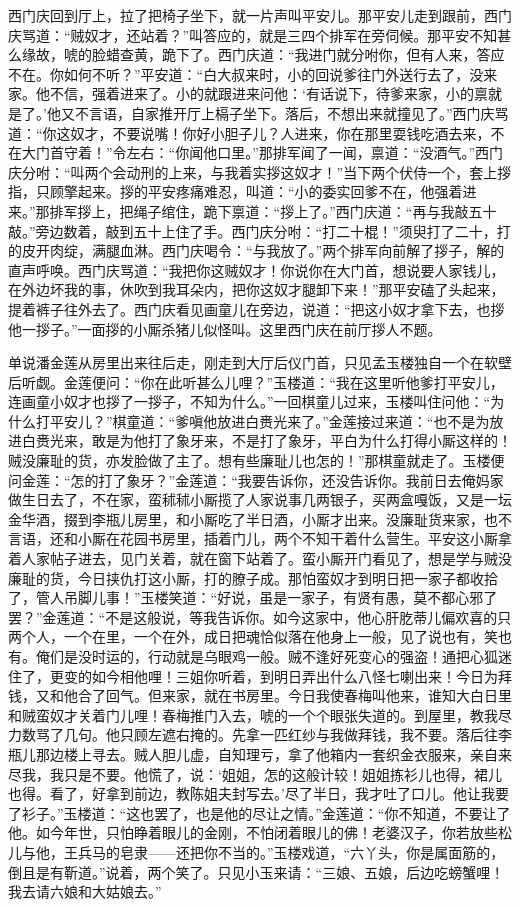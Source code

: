 西门庆回到厅上，拉了把椅子坐下，就一片声叫平安儿。那平安儿走到跟前，西门庆骂道：“贼奴才，还站着？”叫答应的，就是三四个排军在旁伺候。那平安不知甚么缘故，唬的脸蜡查黄，跪下了。西门庆道：“我进门就分咐你，但有人来，答应不在。你如何不听？”平安道：“白大叔来时，小的回说爹往门外送行去了，没来家。他不信，强着进来了。小的就跟进来问他：‘有话说下，待爹来家，小的禀就是了。’他又不言语，自家推开厅上槅子坐下。落后，不想出来就撞见了。”西门庆骂道：“你这奴才，不要说嘴！你好小胆子儿？人进来，你在那里耍钱吃酒去来，不在大门首守着！”令左右：“你闻他口里。”那排军闻了一闻，禀道：“没酒气。”西门庆分咐：“叫两个会动刑的上来，与我着实拶这奴才！”当下两个伏侍一个，套上拶指，只顾擎起来。拶的平安疼痛难忍，叫道：“小的委实回爹不在，他强着进来。”那排军拶上，把绳子绾住，跪下禀道：“拶上了。”西门庆道：“再与我敲五十敲。”旁边数着，敲到五十上住了手。西门庆分咐：“打二十棍！”须臾打了二十，打的皮开肉绽，满腿血淋。西门庆喝令：“与我放了。”两个排军向前解了拶子，解的直声呼唤。西门庆骂道：“我把你这贼奴才！你说你在大门首，想说要人家钱儿，在外边坏我的事，休吹到我耳朵内，把你这奴才腿卸下来！”那平安磕了头起来，提着裤子往外去了。西门庆看见画童儿在旁边，说道：“把这小奴才拿下去，也拶他一拶子。”一面拶的小厮杀猪儿似怪叫。这里西门庆在前厅拶人不题。

单说潘金莲从房里出来往后走，刚走到大厅后仪门首，只见孟玉楼独自一个在软壁后听觑。金莲便问：“你在此听甚么儿哩？”玉楼道：“我在这里听他爹打平安儿，连画童小奴才也拶了一拶子，不知为什么。”一回棋童儿过来，玉楼叫住问他：“为什么打平安儿？”棋童道：“爹嗔他放进白赉光来了。”金莲接过来道：“也不是为放进白赉光来，敢是为他打了象牙来，不是打了象牙，平白为什么打得小厮这样的！贼没廉耻的货，亦发脸做了主了。想有些廉耻儿也怎的！”那棋童就走了。玉楼便问金莲：“怎的打了象牙？”金莲道：“我要告诉你，还没告诉你。我前日去俺妈家做生日去了，不在家，蛮秫秫小厮揽了人家说事几两银子，买两盒嘎饭，又是一坛金华酒，掇到李瓶儿房里，和小厮吃了半日酒，小厮才出来。没廉耻货来家，也不言语，还和小厮在花园书房里，插着门儿，两个不知干着什么营生。平安这小厮拿着人家帖子进去，见门关着，就在窗下站着了。蛮小厮开门看见了，想是学与贼没廉耻的货，今日挟仇打这小厮，打的膫子成。那怕蛮奴才到明日把一家子都收拾了，管人吊脚儿事！”玉楼笑道：“好说，虽是一家子，有贤有愚，莫不都心邪了罢？”金莲道：“不是这般说，等我告诉你。如今这家中，他心肝肐蒂儿偏欢喜的只两个人，一个在里，一个在外，成日把魂恰似落在他身上一般，见了说也有，笑也有。俺们是没时运的，行动就是乌眼鸡一般。贼不逢好死变心的强盗！通把心狐迷住了，更变的如今相他哩！三姐你听着，到明日弄出什么八怪七喇出来！今日为拜钱，又和他合了回气。但来家，就在书房里。今日我使春梅叫他来，谁知大白日里和贼蛮奴才关着门儿哩！春梅推门入去，唬的一个个眼张失道的。到屋里，教我尽力数骂了几句。他只顾左遮右掩的。先拿一匹红纱与我做拜钱，我不要。落后往李瓶儿那边楼上寻去。贼人胆儿虚，自知理亏，拿了他箱内一套织金衣服来，亲自来尽我，我只是不要。他慌了，说：‘姐姐，怎的这般计较！姐姐拣衫儿也得，裙儿也得。看了，好拿到前边，教陈姐夫封写去。’尽了半日，我才吐了口儿。他让我要了衫子。”玉楼道：“这也罢了，也是他的尽让之情。”金莲道：“你不知道，不要让了他。如今年世，只怕睁着眼儿的金刚，不怕闭着眼儿的佛！老婆汉子，你若放些松儿与他，王兵马的皂隶——还把你不当的。”玉楼戏道，“六丫头，你是属面筋的，倒且是有靳道。”说着，两个笑了。只见小玉来请：“三娘、五娘，后边吃螃蟹哩！我去请六娘和大姑娘去。”

